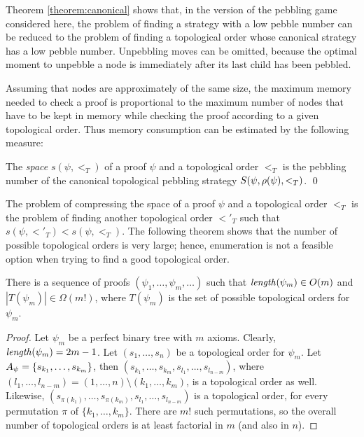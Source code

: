\documentclass{llncs}
\begin{document}
\noindent
Theorem \ref{theorem:canonical} shows that, in the version of the pebbling game considered here, the problem of finding a strategy with a low pebble number can be reduced to the problem of finding a topological order whose canonical strategy has a low pebble number. Unpebbling moves can be omitted, because the optimal moment to unpebble a node is immediately after its last child has been pebbled.

Assuming that nodes are approximately of the same size, the maximum memory needed to check a proof is proportional to the maximum number of nodes that have to be kept in memory while checking the proof according to a given topological order. Thus memory consumption can be estimated by the following measure:

\newcommand{\pspace}[2]{s(#1,#2)}
\begin{definition}[Space]
\label{def:space measure}
The \emph{space} $\pspace{\psi}{<_T}$ 
of a proof $\psi$ and a topological order $<_T$ is the pebbling number of the canonical topological pebbling strategy $S(\psi,\rho(\psi),<_T)$.
\qed
\end{definition}

\noindent
The problem of compressing the space of a proof $\psi$ and a topological order $<_T$ is the problem of finding another topological order $<'_T$ such that $\pspace{\psi}{<'_T} < \pspace{\psi}{<_T}$. The following theorem shows that the number of possible topological orders is very large; hence, enumeration is not a feasible option when trying to find a good topological order.

\begin{theorem}
\label{theorem:enumeration}
There is a sequence of proofs $(\psi_1,\ldots,\psi_m,\ldots)$ such that $\mathit{length}(\psi_m) \in O(m)$ and $|T(\psi_m)| \in \Omega(m!)$, where $T(\psi_m)$ is the set of possible topological orders for $\psi_m$.
\end{theorem}
\begin{proof}
Let $\psi_m$ be a perfect binary tree with $m$ axioms. Clearly, $\mathit{length}(\psi_m) = 2m-1$.
Let $(s_1,\ldots,s_n)$ be a topological order for $\psi_m$. 
Let $A_{\psi} = \{s_{k_1},\ldots,s_{k_m}\}$, then $(s_{k_1},\ldots,s_{k_m},s_{l_1},\ldots,s_{l_{n-m}})$, where $(l_1,\ldots,l_{n-m}) = (1,\ldots,n) \setminus (k_1,\ldots,k_m)$, is a topological order as well. 
Likewise, $(s_{\pi({k_1})},\ldots,s_{\pi({k_m})},s_{l_1},\ldots,s_{l_{n-m}})$ is a topological order, for every permutation $\pi$ of $\{k_1,\ldots,k_m\}$. There are $m!$ such permutations, so the overall number of topological orders is at least factorial in $m$ (and also in $n$).
\end{proof}
\end{document}
